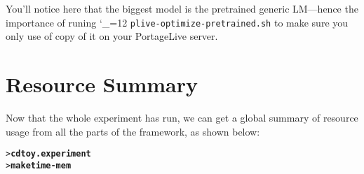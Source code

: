 \documentclass[11pt,letterpaper]{article}
\def\code{\begingroup\catcode`\_=12 \codex}
\newcommand{\codex}[1]{\texttt{#1}\endgroup}
\begin{document}
You'll notice here that the biggest model is the pretrained generic LM---hence the importance of runing
\code{plive-optimize-pretrained.sh} to make sure you only use of copy of it on your PortageLive server.

\section{Resource Summary} \label{ResourceSummary}

Now that the whole experiment has run, we can get a global summary of resource
usage from all the parts of the framework, as shown below:

\begin{small}
\begin{alltt}
> \textbf{cd toy.experiment}
> \textbf{make time-mem}
\end{alltt}
\end{small}
\vspace{-2em}
\end{document}
